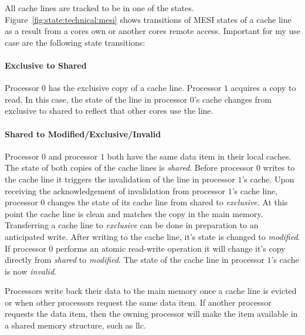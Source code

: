 All cache lines are tracked to be in one of the states.
Figure~\ref{fig:state:technical:mesi} shows transitions of MESI states of a
cache line as a result from a cores own or another cores remote access.
Important for my use case are the following state transitions:

\paragraph{Exclusive to Shared}
Processor $0$ has the exclusive copy of a cache line. Processor $1$ acquires a
copy to read. In this case, the state of the line in processor $0$'s
cache changes from exclusive to shared to reflect that other cores use the line.

\paragraph{Shared to Modified/Exclusive/Invalid}
Processor $0$ and processor $1$ both have the same data item in their local
caches. The state of both copies of the cache lines is \textit{shared}. Before
processor $0$ writes to the cache line it triggers the invalidation of the line
in processor $1$'s cache. Upon receiving the acknowledgement of invalidation
from processor $1$'s cache line, processor $0$ changes the state of its cache
line from shared to \textit{exclusive}. At this point the cache line is clean
and matches the copy in the main memory. Transferring a cache line to
\textit{exclusive} can be done in preparation to an anticipated write. After
writing to the cache line, it's state is changed to \textit{modified}. If
processor $0$ performs an atomic read-write operation it will change it's copy
directly from \textit{shared} to \textit{modified}. The state of the cache line
in processor $1$'s cache is now \textit{invalid}.

Processors write back their data to the main memory once a cache line is evicted
or when other processors request the same data item. If another processor
requests the data item, then the owning processor will make the item available
in a shared memory structure, such as \gls{llc}.

